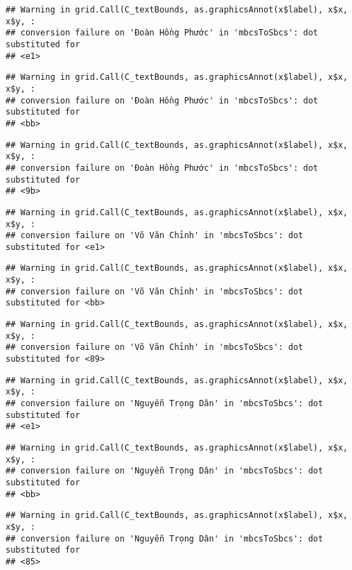\documentclass[
]{article}
\begin{document}
\begin{verbatim}
## Warning in grid.Call(C_textBounds, as.graphicsAnnot(x$label), x$x, x$y, :
## conversion failure on 'Đoàn Hồng Phước' in 'mbcsToSbcs': dot substituted for
## <e1>
\end{verbatim}

\begin{verbatim}
## Warning in grid.Call(C_textBounds, as.graphicsAnnot(x$label), x$x, x$y, :
## conversion failure on 'Đoàn Hồng Phước' in 'mbcsToSbcs': dot substituted for
## <bb>
\end{verbatim}

\begin{verbatim}
## Warning in grid.Call(C_textBounds, as.graphicsAnnot(x$label), x$x, x$y, :
## conversion failure on 'Đoàn Hồng Phước' in 'mbcsToSbcs': dot substituted for
## <9b>
\end{verbatim}

\begin{verbatim}
## Warning in grid.Call(C_textBounds, as.graphicsAnnot(x$label), x$x, x$y, :
## conversion failure on 'Võ Văn Chỉnh' in 'mbcsToSbcs': dot substituted for <e1>
\end{verbatim}

\begin{verbatim}
## Warning in grid.Call(C_textBounds, as.graphicsAnnot(x$label), x$x, x$y, :
## conversion failure on 'Võ Văn Chỉnh' in 'mbcsToSbcs': dot substituted for <bb>
\end{verbatim}

\begin{verbatim}
## Warning in grid.Call(C_textBounds, as.graphicsAnnot(x$label), x$x, x$y, :
## conversion failure on 'Võ Văn Chỉnh' in 'mbcsToSbcs': dot substituted for <89>
\end{verbatim}

\begin{verbatim}
## Warning in grid.Call(C_textBounds, as.graphicsAnnot(x$label), x$x, x$y, :
## conversion failure on 'Nguyễn Trọng Dân' in 'mbcsToSbcs': dot substituted for
## <e1>
\end{verbatim}

\begin{verbatim}
## Warning in grid.Call(C_textBounds, as.graphicsAnnot(x$label), x$x, x$y, :
## conversion failure on 'Nguyễn Trọng Dân' in 'mbcsToSbcs': dot substituted for
## <bb>
\end{verbatim}

\begin{verbatim}
## Warning in grid.Call(C_textBounds, as.graphicsAnnot(x$label), x$x, x$y, :
## conversion failure on 'Nguyễn Trọng Dân' in 'mbcsToSbcs': dot substituted for
## <85>
\end{verbatim}
\end{document}
